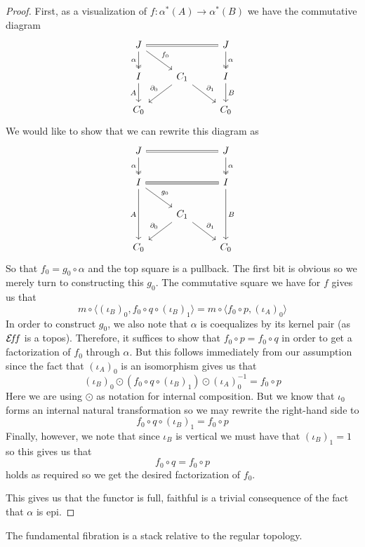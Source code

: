 \begin{proof}
  First, as a visualization of $f : \alpha^*(A) \to \alpha^*(B)$ we
  have the commutative diagram
  \[
    \begin{tikzcd}
      J \ar[d, swap, twoheadrightarrow, "\alpha"] \ar[rd, "f_0"] \ar[rr, equals] && J \ar[d, twoheadrightarrow, "\alpha"]\\
      I \ar[d, swap, "A"] & C_1 \ar[dl, swap, "\partial_0"] \ar[dr, "\partial_1"] & I \ar[d, "B"]\\
      C_0 && C_0
    \end{tikzcd}
  \]
  We would like to show that we can rewrite this diagram as
  \[
    \begin{tikzcd}
      J \ar[d, swap, twoheadrightarrow, "\alpha"] \ar[rr, equals] && J \ar[d, twoheadrightarrow, "\alpha"]\\
      I \ar[dd, swap, "A"] \ar[rr, equals] \ar[dr, "g_0"]  & & I \ar[dd, "B"]\\
      & C_1 \ar[dl, swap, "\partial_0"] \ar[dr, "\partial_1"] &\\
      C_0 && C_0
    \end{tikzcd}
  \]
  So that $f_0 = g_0 \circ \alpha$ and the top square is a
  pullback. The first bit is obvious so we merely turn to constructing
  this $g_0$. The commutative square we have for $f$ gives us that
  \[
    m \circ \langle (\iota_B)_0, f_0 \circ q \circ (\iota_B)_1 \rangle =
    m \circ \langle f_0 \circ p, (\iota_A)_0 \rangle
  \]
  In order to construct $g_0$, we also note that $\alpha$ is
  coequalizes by its kernel pair (as $\mathcal{E}\!f\!f$ is a topos). Therefore, it
  suffices to show that $f_0 \circ p = f_0 \circ q$ in order to get a
  factorization of $f_0$ through $\alpha$. But this follows
  immediately from our assumption since the fact that $(\iota_A)_0$ is
  an isomorphism gives us that
  \[
    (\iota_B)_0 \odot (f_0 \circ q \circ (\iota_B)_1) \odot (\iota_A)_0^{-1} = f_0 \circ p
  \]
  Here we are using $\odot$ as notation for internal composition. But
  we know that $\iota_0$ forms an internal natural transformation so
  we may rewrite the right-hand side to
  \[
    f_0 \circ q \circ (\iota_B)_1 = f_0 \circ p
  \]
  Finally, however, we note that since $\iota_B$ is vertical we must
  have that $(\iota_B)_1 = 1$ so this gives us that
  \[
    f_0 \circ q = f_0 \circ p
  \]
  holds as required so we get the desired factorization of $f_0$.

  This gives us that the functor is full, faithful is a trivial
  consequence of the fact that $\alpha$ is epi.
\end{proof}
\begin{thm}
  The fundamental fibration is a stack relative to the regular topology.
\end{thm}
